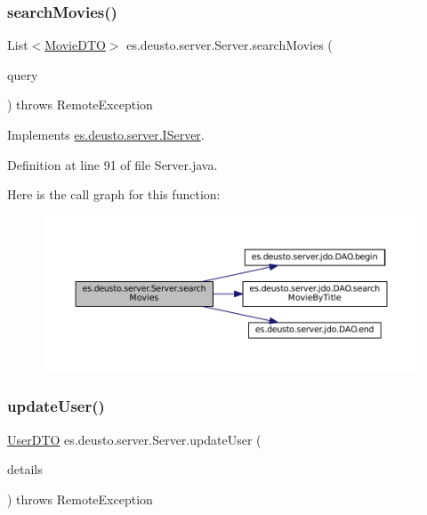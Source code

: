 \subsubsection{\texorpdfstring{searchMovies()}{searchMovies()}}
{\footnotesize\ttfamily List$<$\mbox{\hyperlink{classes_1_1deusto_1_1server_1_1data_1_1_movie_d_t_o}{Movie\+D\+TO}}$>$ es.\+deusto.\+server.\+Server.\+search\+Movies (\begin{DoxyParamCaption}\item[{String}]{query }\end{DoxyParamCaption}) throws Remote\+Exception}



Implements \mbox{\hyperlink{interfacees_1_1deusto_1_1server_1_1_i_server_a50b7dacdeb04d5f1ee3f3b59989ed117}{es.\+deusto.\+server.\+I\+Server}}.



Definition at line 91 of file Server.\+java.

Here is the call graph for this function\+:
\nopagebreak
\begin{figure}[H]
\begin{center}
\leavevmode
\includegraphics[width=350pt]{classes_1_1deusto_1_1server_1_1_server_a16789cc76edd46978ffbb58581caf5db_cgraph}
\end{center}
\end{figure}
\mbox{\label{classes_1_1deusto_1_1server_1_1_server_a74082f91af2065cd600c147296090921}} 
\subsubsection{\texorpdfstring{updateUser()}{updateUser()}}
{\footnotesize\ttfamily \mbox{\hyperlink{classes_1_1deusto_1_1server_1_1data_1_1_user_d_t_o}{User\+D\+TO}} es.\+deusto.\+server.\+Server.\+update\+User (\begin{DoxyParamCaption}\item[{\mbox{\hyperlink{classes_1_1deusto_1_1server_1_1data_1_1_user_details_d_t_o}{User\+Details\+D\+TO}}}]{details }\end{DoxyParamCaption}) throws Remote\+Exception}



